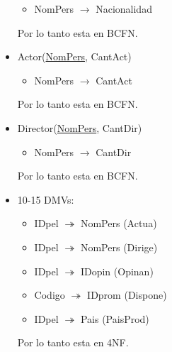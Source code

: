 \documentclass{article}
\begin{document}
\begin{itemize}
      \begin{itemize}
          \item NomPers $\rightarrow$ Nacionalidad
      \end{itemize}
      Por lo tanto esta en BCFN.
    \item Actor(\underline{NomPers}, CantAct)
      \begin{itemize}
          \item NomPers $\rightarrow$ CantAct
      \end{itemize}
      Por lo tanto esta en BCFN.
    \item Director(\underline{NomPers}, CantDir)
      \begin{itemize}
          \item NomPers $\rightarrow$ CantDir
      \end{itemize}
      Por lo tanto esta en BCFN.
    \item 10-15 DMVs:
      \begin{itemize}
        \item IDpel $\twoheadrightarrow$ NomPers (Actua)
        \item IDpel $\twoheadrightarrow$ NomPers (Dirige)
        \item IDpel $\twoheadrightarrow$ IDopin (Opinan)
        \item Codigo $\twoheadrightarrow$ IDprom (Dispone)
        \item IDpel $\twoheadrightarrow$ Pais (PaisProd)
      \end{itemize}
      Por lo tanto esta en 4NF.
  \end{itemize}
\end{document}
